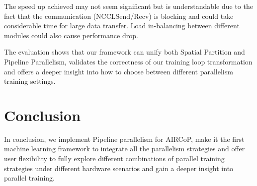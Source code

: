 \documentclass[sigplan]{acmart}\settopmatter{printfolios=true,printccs=false,printacmref=false}
\begin{document}
 The speed up achieved may not seem significant but is understandable due to the fact that the communication (NCCLSend/Recv) is blocking and could take considerable time for large data transfer. Load in-balancing between different modules could also cause performance drop.\par
 The evaluation shows that our framework can unify both Spatial Partition and Pipeline Parallelism, validates the correctness of our training loop transformation and offers a deeper insight into how to choose between different parallelism training settings.
 \section{Conclusion}
In conclusion, we implement Pipeline parallelism for AIRCoP, make it the first machine learning framework to integrate all the parallelism strategies and offer user flexibility to fully explore different combinations of parallel training strategies under different hardware scenarios and gain a deeper insight into parallel training.


\end{document}
